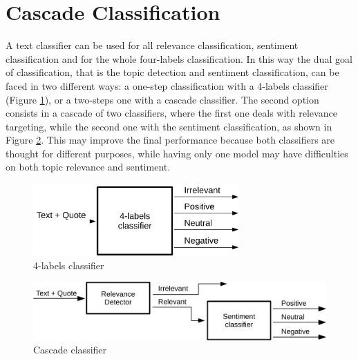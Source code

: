 \section{Cascade Classification}

A text classifier can be used for all relevance classification, sentiment classification and for the whole four-labels classification. In this way the dual goal of classification, that is the topic detection and sentiment classification, can be faced in two different ways: a one-step classification with a 4-labels classifier (Figure \ref{fig:4label-class}), or a two-steps one with a cascade classifier. The second option consists in a cascade of two classifiers, where the first one deals with relevance targeting, while the second one with the sentiment classification, as shown in Figure \ref{fig:cascade-class}. This may improve the final performance because both classifiers are thought for different purposes, while having only one model may have difficulties on both topic relevance and sentiment.


\begin{figure}[ht]
	\centering
	\includegraphics[width=0.7\textwidth]{figures/draw/blocks_class.pdf}
	\caption{4-labels classifier}
	\label{fig:4label-class}
\end{figure}

\begin{figure}[ht]
	\centering
	\includegraphics[width=1\textwidth]{figures/draw/blocks_cascade.pdf}
	\caption{Cascade classifier}
	\label{fig:cascade-class}
\end{figure}














